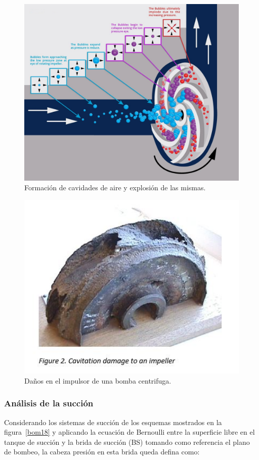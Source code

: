 \documentclass[11pt, oneside]{article}
\begin{document}
\begin{figure}[h]
\centering
\includegraphics[width=12cm]{./figs/bom16.jpg}
\caption{Formaci\'on de cavidades de aire y explosi\'on de las mismas.} 
\label{bom16}
\end{figure}

\begin{figure}[h]
\centering
\includegraphics[width=12cm]{./figs/bom16a.JPG}
\caption{Da\~nos en el impulsor de una bomba centrifuga.} 
\label{bom16a}
\end{figure}

\subsubsection*{An\'alisis de la succi\'on}
Considerando los sistemas de succi\'on de los esquemas mostrados en la figura~\ref{bom18} y aplicando la ecuaci\'on de Bernoulli entre la superficie libre en el tanque de succi\'on y la brida de succi\'on (BS) tomando como referencia el plano de bombeo, la cabeza presi\'on en esta brida queda defina como:
\end{document}
